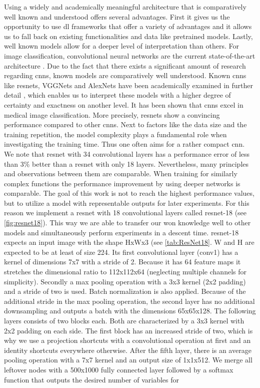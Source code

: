 Using a widely and academically meaningful architecture that is comparatively well known and understood offers several advantages. First it gives us the opportunity to use \acrshort{dl} frameworks that offer a variety of advantages and it allows us to fall back on existing functionalities and data like pretrained models. Lastly, well known models allow for a deeper level of interpretation than others. For image classification, convolutional neural networks are the current state-of-the-art architecture \cite{Albawi.2017}. Due to the fact that there exists a significant amount of research regarding \acrshort{cnn}s, known models are comparatively well understood. Known \acrshort{cnn}s like \acrshort{resnet}s, VGGNets and AlexNets have been academically examined in further detail \cite{He.3162016, WeiYu.2016, Majib.2021}, which enables us to interpret these models with a higher degree of certainty and exactness on another level. It has been shown that \acrshort{cnn}s excel in medical image classification. More precisely, \acrshort{resnet}s show a convincing performance compared to other \acrshort{cnn}s. \cite{Tajbakhsh.2016, He.12102015} Next to factors like the data size and the training repetition, the model complexity plays a fundamental role when investigating the training time. Thus one often aims for a rather compact \acrshort{cnn}. We note that \acrshort{resnet} with 34 convolutional layers has a performance error of less than 3\% better than a \acrshort{resnet} with only 18 layers. Nevertheless, many principles and observations between them are comparable. \cite{He.12102015} When training for similarly complex functions the performance improvement by using deeper networks is comparable. The goal of this work is not to reach the highest performance values, but to utilize a model with representable outputs for later experiments. For this reason we implement a \acrshort{resnet} with 18 convolutional layers called \acrshort{resnet}-18 (see \cref{fig:resnet18}). This way we are able to transfer our won knowledge well to other models and simultaneously perform experiments in a descent time. \acrshort{resnet}-18 expects an input image with the shape HxWx3 (see \cref{tab:ResNet18}. W and H are expected to be at least of size 224. Its first convolutional layer (conv1) has a kernel of dimensions 7x7 with a stride of 2. Because it has 64 feature maps it stretches the dimensional ratio to 112x112x64 (neglecting multiple channels for simplicity). Secondly a max pooling operation with a 3x3 kernel (2x2 padding) and a stride of two is used. Batch normalization is also applied. Because of the additional stride in the max pooling operation, the second layer has no additional downsampling and outputs a batch with the dimensions 65x65x128. The following layers consists of two blocks each. Both are characterized by a 3x3 kernel with 2x2 padding on each side. The first block has an increased stride of two, which is why we use a projection shortcuts with a convolutional operation at first and an identity shortcuts everywhere otherwise. After the fifth layer, there is an average pooling operation with a 7x7 kernel and an output size of 1x1x512. We merge all leftover nodes with a 500x1000 fully connected layer followed by a softmax function that outputs the desired number of variables for 